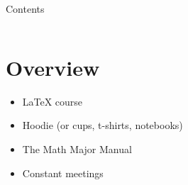\begin{frame}
    \maketitle
\end{frame}

\begin{frame}{Contents}
    \begin{columns}
        \linespread{1.75}\selectfont
         \tableofcontents
    \end{columns}
   
\end{frame}

\section{Overview}

\begin{frame}
    \begin{itemize}
        \item LaTeX course
        \item Hoodie (or cups, t-shirts, notebooks)
        \item The Math Major Manual
        \item Constant meetings
    \end{itemize}
\end{frame}
